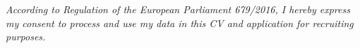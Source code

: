 \documentclass[10pt,A4]{article}
\newcommand{\mystrut}{\rule[-.3\baselineskip]{0pt}{\baselineskip}}
\begin{document}
 \vspace{12pt}

 \vspace{12pt}

 \vspace{12pt}

 \vspace{12pt}




%
%



\null
\vspace*{\fill}
\begin{center}
    \textit{\small According to Regulation of the European Parliament 679/2016, I hereby express my consent to process and use my data in this CV and application for recruiting purposes.}
\end{center}

\null
\hspace{-0.25\linewidth}\colorbox{bgcol}{\makebox[1.5\linewidth][c]{\mystrut \small \textcolor{white}{Francesco Ioli - \today}}}\\[-6pt]

%
%
\end{document}
